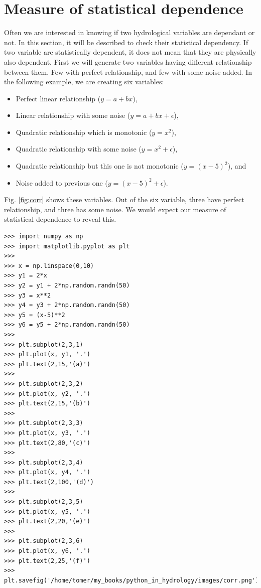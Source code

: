 \documentclass[10pt]{book}
\begin{document}
{\section{Measure of statistical dependence}

Often we are interested in knowing if two hydrological variables are dependant or not. In this section, it will be described to check their statistical dependency. If two variable are statistically dependent, it does not mean that they are physically also dependent. First we will generate two variables having different relationship between them. Few with perfect relationship, and few with some noise added. In the following example, we are creating six variables: 
\begin{itemize}
\item Perfect linear relationship ($y = a +bx$),
\item Linear relationship with some noise ($y = a +bx + \epsilon $),
\item Quadratic relationship which is monotonic ($y = x^2 $),
\item Quadratic relationship with some noise ($y = x^2 + \epsilon $),
\item Quadratic relationship but this one is not monotonic ($y = (x-5)^2 $), and
\item Noise added to previous one ($y = (x-5)^2 + \epsilon $).
\end{itemize}
Fig. \ref{fig:corr} shows these variables. Out of the six variable, three have perfect relationship, and three has some noise. We would expect our measure of statistical dependence to reveal this. 
\beforeverb \begin{verbatim}
>>> import numpy as np
>>> import matplotlib.pyplot as plt
>>> 
>>> x = np.linspace(0,10)
>>> y1 = 2*x 
>>> y2 = y1 + 2*np.random.randn(50)
>>> y3 = x**2
>>> y4 = y3 + 2*np.random.randn(50)
>>> y5 = (x-5)**2
>>> y6 = y5 + 2*np.random.randn(50)
>>> 
>>> plt.subplot(2,3,1)
>>> plt.plot(x, y1, '.')
>>> plt.text(2,15,'(a)')
>>> 
>>> plt.subplot(2,3,2)
>>> plt.plot(x, y2, '.')
>>> plt.text(2,15,'(b)')
>>> 
>>> plt.subplot(2,3,3)
>>> plt.plot(x, y3, '.')
>>> plt.text(2,80,'(c)')
>>> 
>>> plt.subplot(2,3,4)
>>> plt.plot(x, y4, '.')
>>> plt.text(2,100,'(d)')
>>> 
>>> plt.subplot(2,3,5)
>>> plt.plot(x, y5, '.')
>>> plt.text(2,20,'(e)')
>>> 
>>> plt.subplot(2,3,6)
>>> plt.plot(x, y6, '.')
>>> plt.text(2,25,'(f)')
>>> plt.savefig('/home/tomer/my_books/python_in_hydrology/images/corr.png')
\end{verbatim} \afterverb

}
\end{document}
